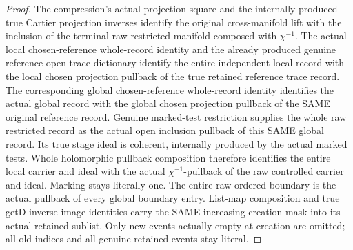 \begin{proof}
The compression's actual projection square and the internally produced true Cartier projection inverses identify the original cross-manifold lift with the inclusion of the terminal raw restricted manifold composed with $\chi^{-1}$. The actual local chosen-reference whole-record identity and the already produced genuine reference open-trace dictionary identify the entire independent local record with the local chosen projection pullback of the true retained reference trace record. The corresponding global chosen-reference whole-record identity identifies the actual global record with the global chosen projection pullback of the SAME original reference record. Genuine marked-test restriction supplies the whole raw restricted record as the actual open inclusion pullback of this SAME global record. Its true stage ideal is coherent, internally produced by the actual marked tests. Whole holomorphic pullback composition therefore identifies the entire local carrier and ideal with the actual $\chi^{-1}$-pullback of the raw controlled carrier and ideal. Marking stays literally one. The entire raw ordered boundary is the actual pullback of every global boundary entry. List-map composition and true getD inverse-image identities carry the SAME increasing creation mask into its actual retained sublist. Only new events actually empty at creation are omitted; all old indices and all genuine retained events stay literal.
\end{proof}

